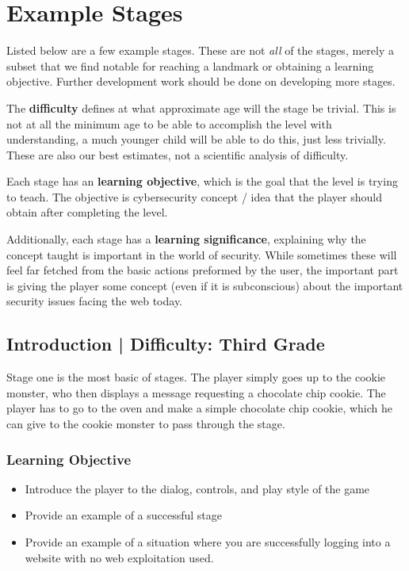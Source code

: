 \documentclass{article}
\begin{document}
\section{Example Stages}

Listed below are a few example stages. These are not \textit{all} of
the stages, merely a subset that we find notable for reaching a
landmark or obtaining a learning objective. Further development work
should be done on developing more stages.

The \textbf{difficulty} defines at what approximate age will the stage
be trivial. This is not at all the minimum age to be able to accomplish
the level with understanding, a much younger child will be able to do
this, just less trivially. These are also our best estimates, not a
scientific analysis of difficulty.

Each stage has an \textbf{learning objective}, which is the goal that
the level is trying to teach. The objective is cybersecurity concept /
idea that the player should obtain after completing the level.

Additionally, each stage has a \textbf{learning significance},
explaining why the concept taught is important in the world of
security. While sometimes these will feel far fetched from the basic
actions preformed by the user, the important part is giving the player
some concept (even if it is subconscious) about the important security
issues facing the web today.

\subsection{Introduction | Difficulty: Third Grade}

Stage one is the most basic of stages. The player simply goes up to
the cookie monster, who then displays a message requesting a chocolate
chip cookie. The player has to go to the oven and make a simple
chocolate chip cookie, which he can give to the cookie monster to pass
through the stage.

\subsubsection{Learning Objective}

\begin{itemize}

  \item Introduce the player to the dialog, controls, and play style of
the game
  \item Provide an example of a successful stage
  \item Provide an example of a situation where you are successfully
logging into a website with no web exploitation used.
\end{itemize}
\end{document}
